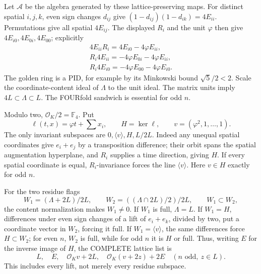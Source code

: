 Let \(\mathcal A\) be the algebra generated by
these lattice-preserving maps.
For distinct spatial \(i,j,k\), even sign
changes \(d_{ij}\) give
\((1-d_{ij})(1-d_{ik})=4E_{ii}\).
Permutations give all spatial \(4E_{ij}\).
The displayed \(R_i\) and the unit \(\varphi\)
then give \(4E_{i0},4E_{0i},4E_{00}\);
explicitly
\[
 \begin{gathered}
 4E_{ii}R_i=4E_{i0}-4\varphi E_{ii},\\
 R_i4E_{ii}=-4\varphi E_{0i}-4\varphi E_{ii},\\
 R_i4E_{i0}=-4\varphi E_{00}-4\varphi E_{i0}.
 \end{gathered}
\]
The golden ring is a PID, for example by its
Minkowski bound \(\sqrt5/2<2\).
Scale the coordinate-content ideal of \(\Lambda\)
to the unit ideal.
The matrix units imply
\(4L\subset\Lambda\subset L\).
The FOURfold sandwich is essential for odd \(n\).

Modulo two, \(\mathcal O_K/2=\mathbb F_4\).
Put
\[
 \ell(t,x)=\varphi t+\sum x_i,\qquad
 H=\ker\ell,\qquad v=(\varphi^2,1,\ldots,1).
\]
The only invariant subspaces are
\(0,\langle v\rangle,H,L/2L\).
Indeed any unequal spatial coordinates give
\(e_i+e_j\) by a transposition difference;
their orbit spans the spatial augmentation
hyperplane, and \(R_i\) supplies a time direction,
giving \(H\).
If every spatial coordinate is equal,
\(R_i\)-invariance forces the line \(\langle v\rangle\).
Here \(v\in H\) exactly for odd \(n\).

For the two residue flags
\[
 W_1=(\Lambda+2L)/2L,\qquad
 W_2=((\Lambda\cap2L)/2)/2L,\qquad W_1\subset W_2,
\]
the content normalization makes \(W_1\ne0\).
If \(W_1\) is full, \(\Lambda=L\).
If \(W_1=H\), differences under even sign
changes of a lift of \(e_i+e_k\), divided by two,
put a coordinate vector in \(W_2\), forcing it full.
If \(W_1=\langle v\rangle\), the same differences
force \(H\subset W_2\); for even \(n\), \(W_2\)
is full, while for odd \(n\) it is \(H\) or full.
Thus, writing \(E\) for the inverse image of \(H\),
the COMPLETE lattice list is
\[
           L,\quad E,\quad\mathcal O_Kv+2L,\quad
           \mathcal O_K(v+2z)+2E\quad(n\text{ odd},\ z\in L).
\]
This includes every lift, not merely every residue
subspace.

